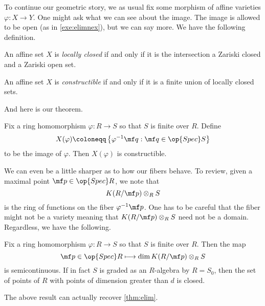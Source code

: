 \documentclass[../notes.tex]{subfiles}
\begin{document}
To continue our geometric story, we as usual fix some morphism of affine varieties $\varphi\colon X\to Y$. One might ask what we can see about the image. The image is allowed to be open (as in \autoref{exe:elimnex}), but we can say more. We have the following definition.
\begin{definition}
	An affine set $X$ is \textit{locally closed} if and only if it is the intersection a Zariski closed and a Zariski open set.
\end{definition}
\begin{definition}[Constructible]
	An affine set $X$ is \textit{constructible} if and only if it is a finite union of locally closed sets.
\end{definition}
And here is our theorem.
\begin{theorem}[Chevalley]
	Fix a ring homomorphism $\varphi\colon R\to S$ so that $S$ is finite over $R$. Define
	\[X(\varphi)\coloneqq\left\{\varphi^{-1}\mf q:\mf q\in\op{Spec}S\right\}\]
	to be the image of $\varphi$. Then $X(\varphi)$ is constructible.
\end{theorem}
We can even be a little sharper as to how our fibers behave. To review, given a maximal point $\mf p\in\op{Spec}R$, we note that
\[K(R/\mf p)\otimes_RS\]
is the ring of functions on the fiber $\varphi^{-1}\mf p$. One has to be careful that the fiber might not be a variety meaning that $K(R/\mf p)\otimes_RS$ need not be a domain. Regardless, we have the following.
\begin{theorem}
	Fix a ring homomorphism $\varphi\colon R\to S$ so that $S$ is finite over $R$. Then the map
	\[\mf p\in\op{Spec}R\longmapsto\dim K(R/\mf p)\otimes_RS\]
	is semicontinuous. If in fact $S$ is graded as an $R$-algebra by $R=S_0$, then the set of points of $R$ with points of dimension greater than $d$ is closed.
\end{theorem}
The above result can actually recover \autoref{thm:elim}.
\end{document}
